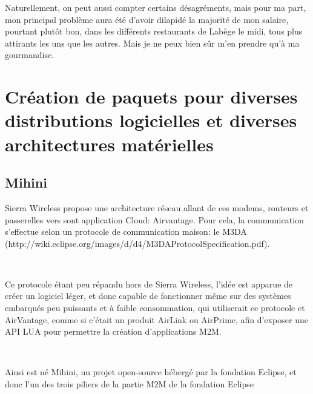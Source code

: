\documentclass{article}
\begin{document}
Naturellement, on peut aussi compter certains désagréments, mais pour ma part, mon principal problème aura été d’avoir dilapidé la majorité de mon salaire, pourtant plutôt bon, dans les différents restaurants de Labège le midi, tous plus attirants les uns que les autres. Mais je ne peux bien sûr m’en prendre qu’à ma gourmandise.

\clearpage

\section{Création de paquets pour diverses distributions logicielles et diverses architectures matérielles}
\subsection{Mihini}

Sierra Wireless propose une architecture réseau allant de ces modems, routeurs et passerelles vers sont application Cloud: Airvantage.
Pour cela, la communication s’effectue selon un protocole de communication maison: le M3DA (http://wiki.eclipse.org/images/d/d4/M3DAProtocolSpecification.pdf).

~

Ce protocole étant peu répandu hors de Sierra Wireless, l’idée est apparue de créer un logiciel léger, et donc capable de fonctionner même sur des systèmes embarqués peu puissants et à faible consommation, qui utiliserait ce protocole et AirVantage, comme si c’était un produit AirLink ou AirPrime, afin d’exposer une API LUA pour permettre la création d’applications M2M.

~

Ainsi est né Mihini, un projet open-source hébergé par la fondation Eclipse, et donc l’un des trois piliers de la partie M2M de la fondation Eclipse
\end{document}
